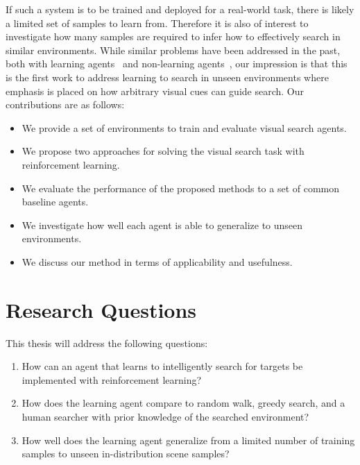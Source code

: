 If such a system is to be trained and deployed for a real-world task, there is likely a limited set of samples to learn from.
Therefore it is also of interest to investigate how many samples are required to infer how to effectively search in similar environments.
While similar problems have been addressed in the past, both with learning agents~\cite{minut_reinforcement_2001,mirowski_learning_2017,ourselin_artificial_2016,caicedo_active_2015} and non-learning agents~\cite{shubina_visual_2010,forssen_informed_2008}, 
our impression is that this is the first work to address learning to search in unseen environments where emphasis is placed on how arbitrary visual cues can guide search.
Our contributions are as follows:

\begin{itemize}
  \item We provide a set of environments to train and evaluate visual search agents.
  \item We propose two approaches for solving the visual search task with reinforcement learning.
  \item We evaluate the performance of the proposed methods to a set of common baseline agents.
  \item We investigate how well each agent is able to generalize to unseen environments.
  \item We discuss our method in terms of applicability and usefulness.
\end{itemize}

\section{Research Questions}
\label{sec:questions}

This thesis will address the following questions:

\begin{enumerate}
  \item \label{itm:rq1} How can an agent that learns to intelligently search for targets be implemented with reinforcement learning?
  \item \label{itm:rq2} How does the learning agent compare to random walk, greedy search, and a human searcher with prior knowledge of the searched environment?
  \item \label{itm:rq3} How well does the learning agent generalize from a limited number of training samples to unseen in-distribution scene samples?
\end{enumerate}

